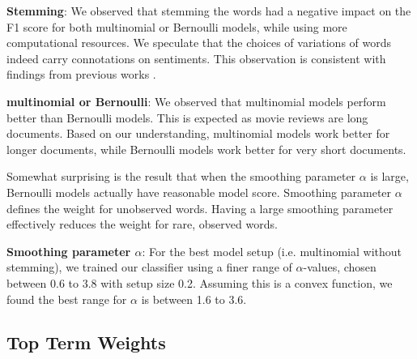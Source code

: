 \documentclass{article}
\begin{document}
\textbf{Stemming}: We observed that stemming the words had a negative impact on the F1 score for both multinomial or Bernoulli models, while using more computational resources. We speculate that the choices of variations of words indeed carry connotations on sentiments. This observation is consistent with findings from previous works \cite{stanford-tutorial, sentiment-twitter}.

\textbf{multinomial or Bernoulli}: We observed that multinomial models perform better than Bernoulli models. This is expected as movie reviews are long documents. Based on our understanding, multinomial models work better for longer documents, while Bernoulli models work better for very short documents.

Somewhat surprising is the result that when the smoothing parameter \(\alpha\) is large, Bernoulli models actually have reasonable model score. Smoothing parameter \(\alpha\) defines the weight for unobserved words. Having a large smoothing parameter effectively reduces the weight for rare, observed words.

\textbf{Smoothing parameter \(\alpha\)}: For the best model setup (i.e. multinomial without stemming), we trained our classifier using a finer range of \(\alpha\)-values, chosen between 0.6 to 3.8 with setup size 0.2. Assuming this is a convex function, we found the best range for \(\alpha\) is between 1.6 to 3.6. 


\subsection{Top Term Weights}
\label{sec:TopWords}

\end{document}
